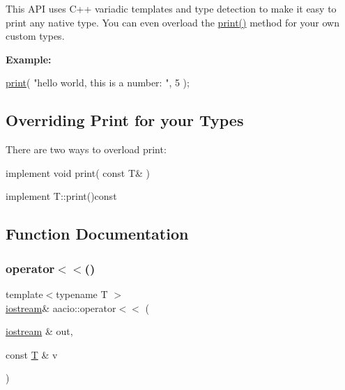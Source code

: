 This A\+PI uses C++ variadic templates and type detection to make it easy to print any native type. You can even overload the {\ttfamily \mbox{\hyperlink{group__console_cppapi_ga2780132b8484a2674ef9254699d12968}{print()}}} method for your own custom types.

{\bfseries Example\+:} 
\begin{DoxyCode}
\mbox{\hyperlink{print_8hpp_a291145c6469a570728575802ed6ad965}{print}}( \textcolor{stringliteral}{"hello world, this is a number: "}, 5 );
\end{DoxyCode}
\hypertarget{group__console_cppapi_override}{}\subsection{Overriding Print for your Types}\label{group__console_cppapi_override}
There are two ways to overload print\+:
\begin{DoxyEnumerate}
\item implement void print( const T\& )
\item implement T\+::print()const 
\end{DoxyEnumerate}

\subsection{Function Documentation}
\mbox{\label{group__console_cppapi_ga9573031ece85c11fb0baeaab3a36eb73}} 
\subsubsection{\texorpdfstring{operator$<$$<$()}{operator<<()}}
{\footnotesize\ttfamily template$<$typename T $>$ \\
\mbox{\hyperlink{classaacio_1_1iostream}{iostream}}\& aacio\+::operator$<$$<$ (\begin{DoxyParamCaption}\item[{\mbox{\hyperlink{classaacio_1_1iostream}{iostream}} \&}]{out,  }\item[{const \mbox{\hyperlink{struct_t}{T}} \&}]{v }\end{DoxyParamCaption})\hspace{0.3cm}{\ttfamily [inline]}}



